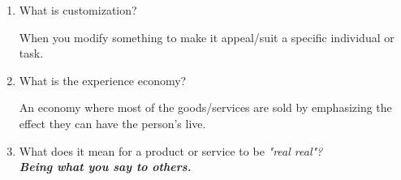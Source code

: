 \begin{enumerate}
  \item What is customization? \\
    \begin{definition}[Customization]
      When you modify something to make it appeal/suit a specific individual or
      task.
    \end{definition}
  \item What is the experience economy? \\
    \begin{definition}
      An economy where most of the goods/services are sold by emphasizing the
      effect they can have the person's live.
    \end{definition}
  \item What does it mean for a product or service to be \it{"real real"}? \\
    \bf{Being what you say to others.}
\end{enumerate}
